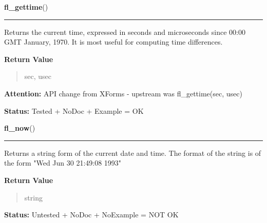 \hspace{.8\funcindent}\begin{boxedminipage}{\funcwidth}

    \raggedright \textbf{fl\_gettime}()

    \vspace{-1.5ex}

    \rule{\textwidth}{0.5\fboxrule}
\setlength{\parskip}{2ex}
    Returns the current time, expressed in seconds and microseconds since 
    00:00 GMT January, 1970. It is most useful for computing time 
    differences.

\setlength{\parskip}{1ex}
      \textbf{Return Value}
    \vspace{-1ex}

      \begin{quote}
      sec, usec

      \end{quote}

\textbf{Attention:} API change from XForms - upstream was fl\_gettime(sec, usec)



\textbf{Status:} Tested + NoDoc + Example = OK



    \end{boxedminipage}

    \label{xformslib:library:fl_now}

    \vspace{0.5ex}

\hspace{.8\funcindent}\begin{boxedminipage}{\funcwidth}

    \raggedright \textbf{fl\_now}()

    \vspace{-1.5ex}

    \rule{\textwidth}{0.5\fboxrule}
\setlength{\parskip}{2ex}
    Returns a string form of the current date and time. The format of the 
    string is of the form "Wed Jun 30 21:49:08 1993"

\setlength{\parskip}{1ex}
      \textbf{Return Value}
    \vspace{-1ex}

      \begin{quote}
      string

      \end{quote}

\textbf{Status:} Untested + NoDoc + NoExample = NOT OK



    \end{boxedminipage}


